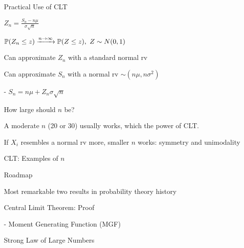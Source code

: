 \begin{frame}{Practical Use of CLT}

$Z_n = \frac{S_n - n\mu}{\sigma \sqrt{n}}$

$\mathbb{P}( Z_n \le z ) \xrightarrow{n \rightarrow \infty} \mathbb{P}( Z \le z ), \ Z \sim N(0,1)$

\plitemsep 0.1in
\bci 
\item<2-> Can approximate $Z_n$ with a standard normal rv
\item<4-> Can approximate $S_n$ with a normal rv $\sim  (n\mu, n\sigma^2)$

- $S_n = n \mu + Z_n\sigma\sqrt{n}$
\item<5-> How large should $n$ be?
\bci
\item<6-> A moderate $n$ (20 or 30) usually works, which the power of CLT.

\item<7-> If $X_i$ resembles a normal rv more, smaller $n$ works: symmetry and unimodality\footnotemark
{}
\eci
\eci 


\end{frame}


\begin{frame}{CLT: Examples of $n$}

\centering
{}


\end{frame}



\begin{frame}{Roadmap}

\plitemsep 0.1in

\bci 
\item Most remarkable two results in probability theory history

\bigskip

\item {}
\item {}
\item {}

\item Central Limit Theorem: Proof

- Moment Generating Function (MGF)

\item Strong Law of Large Numbers
\eci 

\end{frame}


